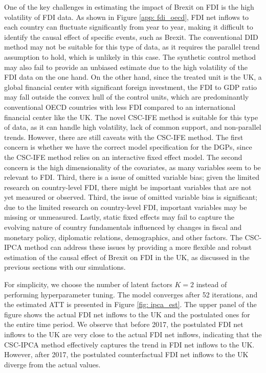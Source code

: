 \documentclass[12pt]{article}
\begin{document}
One of the key challenges in estimating the impact of Brexit on FDI is the high volatility of FDI data. As shown in Figure \ref{app: fdi_oecd}, FDI net inflows to each country can fluctuate significantly from year to year, making it difficult to identify the causal effect of specific events, such as Brexit. The conventional DID method may not be suitable for this type of data, as it requires the parallel trend assumption to hold, which is unlikely in this case. The synthetic control method may also fail to provide an unbiased estimate due to the high volatility of the FDI data on the one hand. On the other hand, since the treated unit is the UK, a global financial center with significant foreign investment, the FDI to GDP ratio may fall outside the convex hull of the control units, which are predominantly conventional OECD countries with less FDI compared to an international financial center like the UK. The novel CSC-IFE method is suitable for this type of data, as it can handle high volatility, lack of common support, and non-parallel trends. However, there are still caveats with the CSC-IFE method. The first concern is whether we have the correct model specification for the DGPs, since the CSC-IFE method relies on an interactive fixed effect model. The second concern is the high dimensionality of the covariates, as many variables seem to be relevant to FDI. Third, there is a issue of omitted variable bias; given the limited research on country-level FDI, there might be important variables that are not yet measured or observed. Third, the issue of omitted variable bias is significant; due to the limited research on country-level FDI, important variables may be missing or unmeasured. Lastly, static fixed effects may fail to capture the evolving nature of country fundamentals influenced by changes in fiscal and monetary policy, diplomatic relations, demographics, and other factors. The CSC-IPCA method can address these issues by providing a more flexible and robust estimation of the causal effect of Brexit on FDI in the UK, as discussed in the previous sections with our simulations.

For simplicity, we choose the number of latent factors $K = 2$ instead of performing hyperparameter tuning. The model converges after 52 iterations, and the estimated ATT is presented in Figure \ref{fig: ipca_est}. The upper panel of the figure shows the actual FDI net inflows to the UK and the postulated ones for the entire time period. We observe that before 2017, the postulated FDI net inflows to the UK are very close to the actual FDI net inflows, indicating that the CSC-IPCA method effectively captures the trend in FDI net inflows to the UK. However, after 2017, the postulated counterfactual FDI net inflows to the UK diverge from the actual values. 
\end{document}
